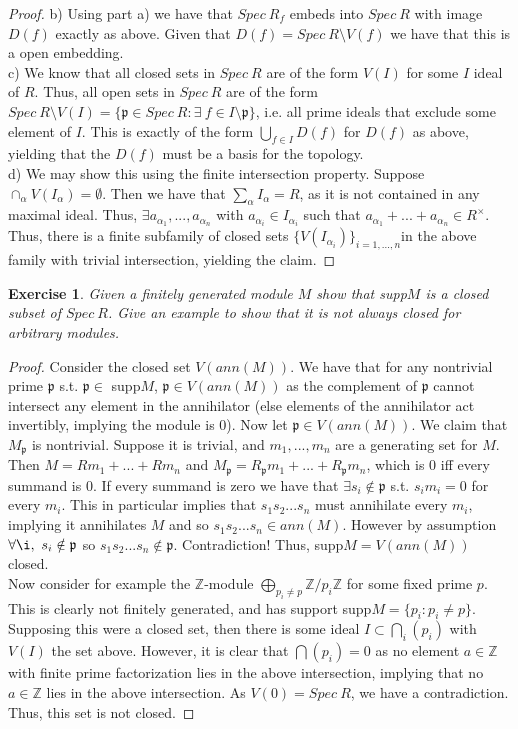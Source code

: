 \documentclass{article}
\newcommand{\bb}[1]{\mathbb{#1}}
\newcommand{\fk}[1]{\mathfrak{#1}}
\newtheorem{exercise}{Exercise}
\begin{document}
\begin{proof}
  b) Using part a) we have that $Spec \ R_{f}$ embeds into $Spec \ R$ with image $D(f)$ exactly as above. Given that $D(f) = Spec \ R \setminus V(f)$ we have that this is a open embedding. \\

  c) We know that all closed sets in $Spec \ R$ are of the form $V(I)$ for some $I$ ideal of $R$. Thus, all open sets in $Spec \ R$ are of the form $Spec \ R \setminus V(I) = \{\fk{p} \in Spec \ R : \exists \ f \in I \setminus \fk{p}\}$, i.e. all prime ideals that exclude some element of $I$. This is exactly of the form $\bigcup_{f \in I}D(f)$ for $D(f)$ as above, yielding that the $D(f)$ must be a basis for the topology. \\

  d) We may show this using the finite intersection property. Suppose $\cap_{\alpha} V(I_{\alpha}) = \emptyset$. Then we have that $\sum_{\alpha} I_{\alpha} = R$, as it is not contained in any maximal ideal. Thus, $\exists a_{\alpha_{1}},...,a_{\alpha_{n}}$ with $a_{\alpha_{i}} \in I_{\alpha_{i}}$ such that $a_{\alpha_{1}}+ ... + a_{\alpha_{n}} \in R^{\times}$. Thus, there is a finite subfamily of closed sets $\{V(I_{\alpha_{i}})\}_{i=1,...,n}$in the above family with trivial intersection, yielding the claim.
\end{proof}
\newpage 
\begin{exercise}
  Given a finitely generated module $M$ show that supp$M$ is a closed subset of $Spec \ R$. Give an example to show that it is not always closed for arbitrary modules.
\end{exercise}
\begin{proof}
  Consider the closed set $V(ann(M))$. We have that for any nontrivial prime $\fk{p}$ s.t. $\fk{p} \in$ supp$M$, $\fk{p} \in V(ann(M))$ as the complement of $\fk{p}$ cannot intersect any element in the annihilator (else elements of the annihilator act invertibly, implying the module is $0$). Now let $\fk{p} \in V(ann(M))$. We claim that $M_{\fk{p}}$ is nontrivial. Suppose it is trivial, and $m_{1},...,m_{n}$ are a generating set for $M$. Then $M = Rm_{1} + ... + Rm_{n}$ and $M_{\fk{p}} = R_{\fk{p}}m_{1} + ... + R_{\fk{p}}m_{n}$, which is 0 iff every summand is 0. If every summand is zero we have that $\exists s_{i} \notin \fk{p}$ s.t. $s_{i}m_{i} = 0$ for every $m_{i}$. This in particular implies that $s_{1}s_{2}...s_{n}$ must annihilate every $m_{i}$, implying it annihilates $M$ and so $s_{1}s_{2}...s_{n} \in ann(M)$. However by assumption $\forall \i, \ s_{i} \notin \fk{p}$ so $s_{1}s_{2}...s_{n} \notin \fk{p}$. Contradiction! Thus, supp$M = V(ann(M))$ closed. \\
  Now consider for example the $\bb{Z}$-module $\bigoplus_{p_{i} \neq p}\bb{Z}/p_{i}\bb{Z}$ for some fixed prime $p$. This is clearly not finitely generated, and has support supp$M = \{p_{i} : p_{i} \neq p \}$. Supposing this were a closed set, then there is some ideal $I \subset \bigcap_{i}(p_{i})$ with $V(I)$ the set above. However, it is clear that $\bigcap (p_{i}) = 0$ as no element $a \in \bb{Z}$ with finite prime factorization lies in the above intersection, implying that no $a \in \bb{Z}$ lies in the above intersection. As $V(0) = Spec \ R$, we have a contradiction. Thus, this set is not closed.
\end{proof}
\end{document}
